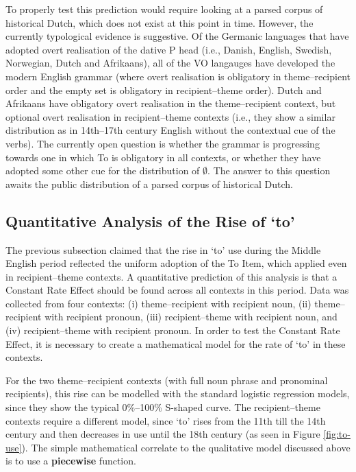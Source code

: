 	To properly test this prediction would require looking at a parsed corpus of historical Dutch, which does not exist at this point in time. However, the currently typological evidence is suggestive. Of the Germanic languages that have adopted overt realisation of the dative P head (i.e., Danish, English, Swedish, Norwegian, Dutch and Afrikaans), all of the VO langauges have developed the modern English grammar (where overt realisation is obligatory in theme--recipient order and the empty set is obligatory in recipient--theme order). Dutch and Afrikaans have obligatory overt realisation in the theme--recipient context, but optional overt realisation in recipient--theme contexts (i.e., they show a similar distribution as in 14th--17th century English without the contextual cue of the verbs). The currently open question is whether the grammar is progressing towards one in which To is obligatory in all contexts, or whether they have adopted some other cue for the distribution of $\emptyset$. The answer to this question awaits the public distribution of a parsed corpus of historical Dutch.

	\subsection{Quantitative Analysis of the Rise of `to'}
	The previous subsection claimed that the rise in `to' use during the Middle English period reflected the uniform adoption of the To Item, which applied even in recipient--theme contexts. A quantitative prediction of this analysis is that a Constant Rate Effect should be found across all contexts in this period. Data was collected from four contexts: (i) theme--recipient with recipient noun, (ii) theme--recipient with recipient pronoun, (iii) recipient--theme with recipient noun, and (iv) recipient--theme with recipient pronoun. In order to test the Constant Rate Effect, it is necessary to create a mathematical model for the rate of `to' in these contexts.
	
	For the two theme--recipient contexts (with full noun phrase and pronominal recipients), this rise can be modelled with the standard logistic regression models, since they show the typical 0\%--100\% S-shaped curve. The recipient--theme contexts require a different model, since `to' rises from the 11th till the 14th century and then decreases in use until the 18th century (as seen in Figure \ref{fig:to-use}). The simple mathematical correlate to the qualitative model discussed above is to use a \textbf{piecewise} function. 
	
